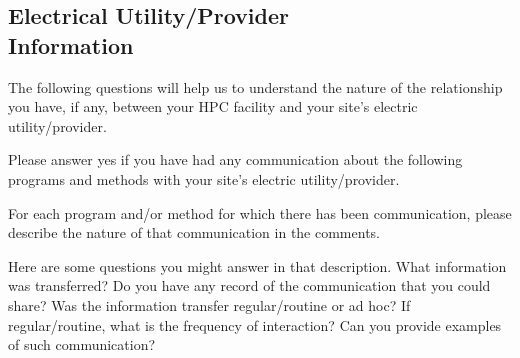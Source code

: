 \subsection{Electrical Utility/Provider\\ Information}
The following questions will help us to understand the nature of the relationship you have, 
if any, between your HPC facility and your site's electric utility/provider.

Please answer yes if you have had any communication about the following programs and 
methods with your site's electric utility/provider.

For each program and/or method for which there has been communication, please describe 
the nature of that communication in the comments.

Here are some questions you might answer in that description. What information was transferred? 
Do you have any record of the communication that you could share? Was the information 
transfer regular/routine or ad hoc? If regular/routine, what is the frequency of interaction? 
Can you provide examples of such communication? 

